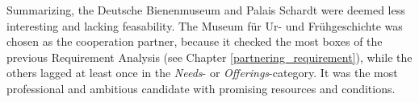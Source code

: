Summarizing, the Deutsche Bienenmuseum and Palais Schardt were deemed less interesting and lacking feasability. The Museum für Ur- und Frühgeschichte was chosen as the cooperation partner, because it checked the most boxes of the previous Requirement Analysis (see Chapter \ref{partnering_requirement}), while the others lagged at least once in the \textit{Needs}- or \textit{Offerings}-category. It was the most professional and ambitious candidate with promising resources and conditions.

%

